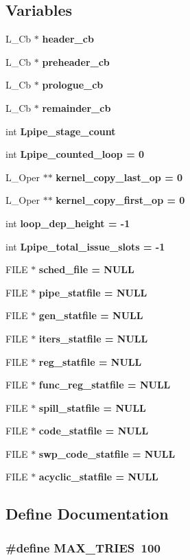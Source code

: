 \subsection*{Variables}
\begin{CompactItemize}
\item 
L\_\-Cb $\ast$ \bf{header\_\-cb}
\item 
L\_\-Cb $\ast$ \bf{preheader\_\-cb}
\item 
L\_\-Cb $\ast$ \bf{prologue\_\-cb}
\item 
L\_\-Cb $\ast$ \bf{remainder\_\-cb}
\item 
int \bf{Lpipe\_\-stage\_\-count}
\item 
int \bf{Lpipe\_\-counted\_\-loop} = 0
\item 
L\_\-Oper $\ast$$\ast$ \bf{kernel\_\-copy\_\-last\_\-op} = 0
\item 
L\_\-Oper $\ast$$\ast$ \bf{kernel\_\-copy\_\-first\_\-op} = 0
\item 
int \bf{loop\_\-dep\_\-height} = -1
\item 
int \bf{Lpipe\_\-total\_\-issue\_\-slots} = -1
\item 
FILE $\ast$ \bf{sched\_\-file} = NULL
\item 
FILE $\ast$ \bf{pipe\_\-statfile} = NULL
\item 
FILE $\ast$ \bf{gen\_\-statfile} = NULL
\item 
FILE $\ast$ \bf{iters\_\-statfile} = NULL
\item 
FILE $\ast$ \bf{reg\_\-statfile} = NULL
\item 
FILE $\ast$ \bf{func\_\-reg\_\-statfile} = NULL
\item 
FILE $\ast$ \bf{spill\_\-statfile} = NULL
\item 
FILE $\ast$ \bf{code\_\-statfile} = NULL
\item 
FILE $\ast$ \bf{swp\_\-code\_\-statfile} = NULL
\item 
FILE $\ast$ \bf{acyclic\_\-statfile} = NULL
\end{CompactItemize}


\subsection{Define Documentation}
\subsubsection{\setlength{\rightskip}{0pt plus 5cm}\#define MAX\_\-TRIES~100}\label{l__softpipe_8c_fd63d23830ad86d01b6fff2e6c615f7e}




